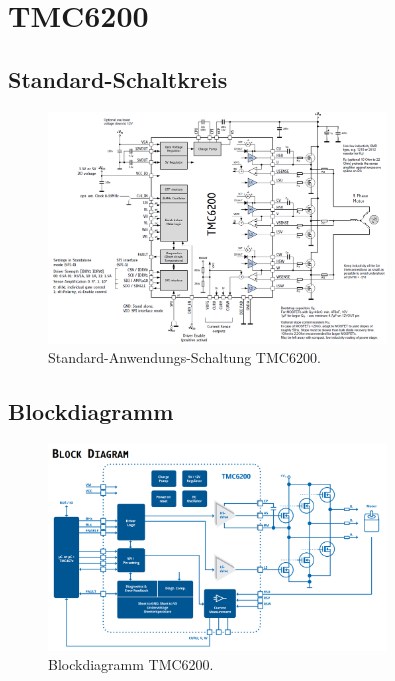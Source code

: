 \section{TMC6200}\label{Appendix:TMC6200}

\subsection{Standard-Schaltkreis}\label{Appendix:Schaltung_TMC6200}

\begin{figure}[H]
	\centering
	\includegraphics[width=0.8\textwidth]{graphics/Standard_Application_Cirquit_TMC6200.png}
	\caption{Standard-Anwendungs-Schaltung TMC6200.\cite[S.1]{trinamicmotion_control_gmbh__co_kg_tmc6200_2019}}
	\label{fig:Schaltung_TMC6200}
\end{figure}

\subsection{Blockdiagramm}\label{Appendix:Blockdiagramm_TMC6200}

\begin{figure}[H]
	\centering
	\includegraphics[width=0.8\textwidth]{graphics/Blockdiagramm_TMC6200.png}
	\caption{Blockdiagramm TMC6200.\cite[S.5]{trinamicmotion_control_gmbh__co_kg_tmc6200_2019}}
	\label{fig:Blockdiagramm_TMC6200}
\end{figure}

